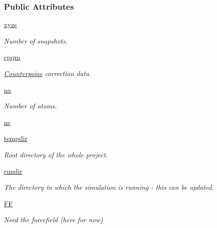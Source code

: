 \subsubsection*{Public Attributes}
\begin{DoxyCompactItemize}
\item 
\hyperlink{classforcebalance_1_1counterpoise_1_1Counterpoise_a2793b896bff71a3c6b9c6f6568ba1be2}{xyzs}
\begin{DoxyCompactList}\small\item\em Number of snapshots. \end{DoxyCompactList}\item 
\hyperlink{classforcebalance_1_1counterpoise_1_1Counterpoise_a55fa01e66b9171055b8d8a754a39997a}{cpqm}
\begin{DoxyCompactList}\small\item\em \hyperlink{classforcebalance_1_1counterpoise_1_1Counterpoise}{Counterpoise} correction data. \end{DoxyCompactList}\item 
\hyperlink{classforcebalance_1_1counterpoise_1_1Counterpoise_a4b7699f3f3b2bd34aaa3fe8374c2ff69}{na}
\begin{DoxyCompactList}\small\item\em Number of atoms. \end{DoxyCompactList}\item 
\hyperlink{classforcebalance_1_1counterpoise_1_1Counterpoise_a2a8334eaf74299344a1cf53be98f150b}{ns}
\item 
\hyperlink{classforcebalance_1_1target_1_1Target_aa1f01b5b78db253b5b66384ed11ed193}{tempdir}
\begin{DoxyCompactList}\small\item\em Root directory of the whole project. \end{DoxyCompactList}\item 
\hyperlink{classforcebalance_1_1target_1_1Target_a6872de5b2d4273b82336ea5b0da29c9e}{rundir}
\begin{DoxyCompactList}\small\item\em The directory in which the simulation is running -\/ this can be updated. \end{DoxyCompactList}\item 
\hyperlink{classforcebalance_1_1target_1_1Target_a38a37919783141ea37fdcf8b00ce0aaf}{F\-F}
\begin{DoxyCompactList}\small\item\em Need the forcefield (here for now) \end{DoxyCompactList}\item 

\end{DoxyCompactItemize}
